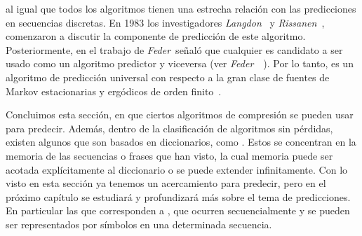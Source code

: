 \lzSieteOcho al igual que todos los algoritmos \losslessdatacompression tienen una estrecha relación con las predicciones en secuencias discretas. En 1983 los investigadores \emph{Langdon}~\cite{Langdon1983} y \emph{Rissanen}~\cite{Rissanen1983}, comenzaron a discutir la componente de predicción de este algoritmo. Posteriormente, en el trabajo de \emph{Feder}~\etal señaló que cualquier \LDC es candidato a ser usado como un algoritmo predictor y viceversa (ver \emph{Feder}~\etal~\cite{Feder1992}). Por lo tanto, \lzSieteOcho es un algoritmo de predicción universal con respecto a la gran clase de fuentes de Markov estacionarias y ergódicos de orden finito~\cite{Begleiter2004}.

	




\uncm
Concluimos esta sección, en que ciertos algoritmos de compresión se pueden usar para predecir. Además, dentro de la clasificación de algoritmos sin pérdidas, existen algunos que son basados en diccionarios, como \lzSieteOcho. Estos se concentran en la memoria de las secuencias o frases que han visto, la cual memoria puede ser acotada explícitamente al diccionario o se puede extender infinitamente. Con lo visto en esta sección ya tenemos un acercamiento para predecir, pero en el próximo capítulo se estudiará y profundizará más sobre el tema de predicciones. En particular las que corresponden a \webasccesslog, que ocurren secuencialmente y se pueden ser representados por símbolos en una determinada secuencia.




